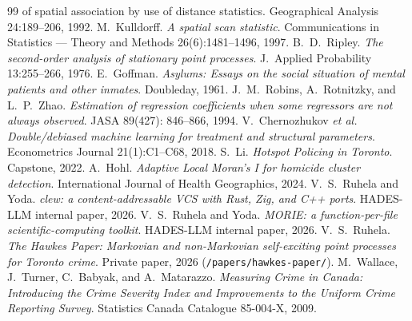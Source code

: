 \documentclass[11pt,a4paper]{article}
\newcommand{\1}{\mathbf{1}}
\theoremstyle{plain}
\theoremstyle{definition}
\begin{document}
\begin{thebibliography}{99}
{  of spatial association by use of distance statistics}.
  Geographical Analysis 24:189--206, 1992.
 M.~Kulldorff. \emph{A spatial scan
  statistic}. Communications in Statistics --- Theory and Methods
  26(6):1481--1496, 1997.
 B.~D.~Ripley. \emph{The second-order analysis
  of stationary point processes}. J.~Applied Probability
  13:255--266, 1976.
 E.~Goffman. \emph{Asylums: Essays on
  the social situation of mental patients and other inmates}.
  Doubleday, 1961.
 J.~M.~Robins, A.~Rotnitzky, and
  L.~P.~Zhao. \emph{Estimation of regression coefficients when
  some regressors are not always observed}. JASA 89(427):
  846--866, 1994.
 V.~Chernozhukov \emph{et al.}
  \emph{Double/debiased machine learning for treatment and
  structural parameters}. Econometrics Journal 21(1):C1--C68,
  2018.
 S.~Li. \emph{Hotspot Policing in Toronto}.
  Capstone, 2022.
 A.~Hohl. \emph{Adaptive Local Moran's I for
  homicide cluster detection}. International Journal of Health
  Geographics, 2024.
 V.~S.~Ruhela and Yoda. \emph{clew: a
  content-addressable VCS with Rust, Zig, and C++ ports}.
  HADES-LLM internal paper, 2026.
 V.~S.~Ruhela and Yoda. \emph{MORIE:
  a function-per-file scientific-computing toolkit}. HADES-LLM
  internal paper, 2026.
 V.~S.~Ruhela. \emph{The Hawkes Paper:
  Markovian and non-Markovian self-exciting point processes for
  Toronto crime}. Private paper, 2026
  (\texttt{/papers/hawkes-paper/}).
 M.~Wallace, J.~Turner, C.~Babyak, and
  A.~Matarazzo.  \emph{Measuring Crime in Canada: Introducing the
  Crime Severity Index and Improvements to the Uniform Crime
  Reporting Survey}.  Statistics Canada Catalogue 85-004-X, 2009.
\end{thebibliography}
\end{document}
